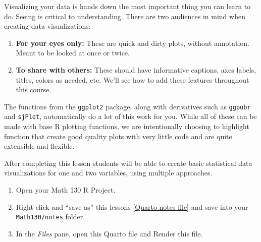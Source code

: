\documentclass[
  letterpaper,
  DIV=11,
  numbers=noendperiod,
  oneside]{scrreprt}
\providecommand{\tightlist}{%
  \setlength{\itemsep}{0pt}\setlength{\parskip}{0pt}}\usepackage{longtable,booktabs,array}
\begin{document}
{}

Visualizing your data is hands down the most important thing you can
learn to do. Seeing is critical to understanding. There are two
audiences in mind when creating data visualizations:

\begin{enumerate}
\def\labelenumi{\arabic{enumi}.}
\tightlist
\item
  \textbf{For your eyes only:} These are quick and dirty plots, without
  annotation. Meant to be looked at once or twice.
\item
  \textbf{To share with others:} These should have informative captions,
  axes labels, titles, colors as needed, etc. We'll see how to add these
  features throughout this course.
\end{enumerate}

The functions from the \texttt{ggplot2} package, along with derivatives
such as \texttt{ggpubr} and \texttt{sjPlot}, automatically do a lot of
this work for you. While all of these can be made with base R plotting
functions, we are intentionally choosing to highlight function that
create good quality plots with very little code and are quite extensible
and flexible.

\begin{tcolorbox}[enhanced jigsaw, bottomrule=.15mm, colback=white, colframe=quarto-callout-note-color-frame, toprule=.15mm, coltitle=black, rightrule=.15mm, opacitybacktitle=0.6, colbacktitle=quarto-callout-note-color!10!white, toptitle=1mm, leftrule=.75mm, breakable, bottomtitle=1mm, titlerule=0mm, title={🎓 Learning Objectives}, arc=.35mm, left=2mm, opacityback=0]

After completing this lesson students will be able to create basic
statistical data visualizations for one and two variables, using
multiple approaches.

\end{tcolorbox}

\begin{tcolorbox}[enhanced jigsaw, bottomrule=.15mm, colback=white, colframe=quarto-callout-tip-color-frame, toprule=.15mm, coltitle=black, rightrule=.15mm, opacitybacktitle=0.6, colbacktitle=quarto-callout-tip-color!10!white, toptitle=1mm, leftrule=.75mm, breakable, bottomtitle=1mm, titlerule=0mm, title={👉 Prepare}, arc=.35mm, left=2mm, opacityback=0]

\begin{enumerate}
\def\labelenumi{\arabic{enumi}.}
\tightlist
\item
  Open your Math 130 R Project.
\item
  Right click and ``save as'' this lessons
  \href{notes/plots1_notes.qmd}{{[}Quarto notes file{]}} and save into
  your \texttt{Math130/notes} folder.
\item
  In the \emph{Files} pane, open this Quarto file and Render this file.
\end{enumerate}

\end{tcolorbox}
\end{document}
